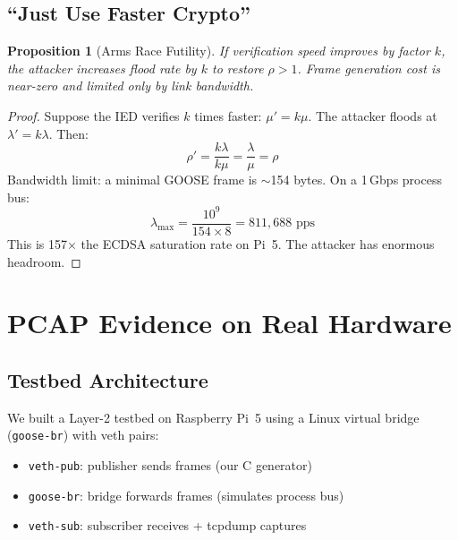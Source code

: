 \documentclass[11pt,a4paper,twocolumn]{article}
\newtheorem{proposition}{Proposition}
\begin{document}
\subsection{``Just Use Faster Crypto''}

\begin{proposition}[Arms Race Futility]
If verification speed improves by factor $k$, the attacker increases flood rate by $k$ to restore $\rho > 1$. Frame generation cost is near-zero and limited only by link bandwidth.
\end{proposition}

\begin{proof}
Suppose the IED verifies $k$ times faster: $\mu' = k\mu$. The attacker floods at $\lambda' = k\lambda$. Then:
\begin{equation}
\rho' = \frac{k\lambda}{k\mu} = \frac{\lambda}{\mu} = \rho
\end{equation}
Bandwidth limit: a minimal GOOSE frame is $\sim$154 bytes. On a 1\,Gbps process bus:
\begin{equation}
\lambda_{\max} = \frac{10^9}{154 \times 8} = 811{,}688 \text{ pps}
\end{equation}
This is 157$\times$ the ECDSA saturation rate on Pi~5. The attacker has enormous headroom.
\end{proof}

\section{PCAP Evidence on Real Hardware}
\label{sec:pcap}

\subsection{Testbed Architecture}

We built a Layer-2 testbed on Raspberry Pi~5 using a Linux virtual bridge (\texttt{goose-br}) with veth pairs:

\begin{itemize}[leftmargin=1.5em,itemsep=1pt]
\item \texttt{veth-pub}: publisher sends frames (our C generator)
\item \texttt{goose-br}: bridge forwards frames (simulates process bus)
\item \texttt{veth-sub}: subscriber receives + tcpdump captures
\end{itemize}
\end{document}
